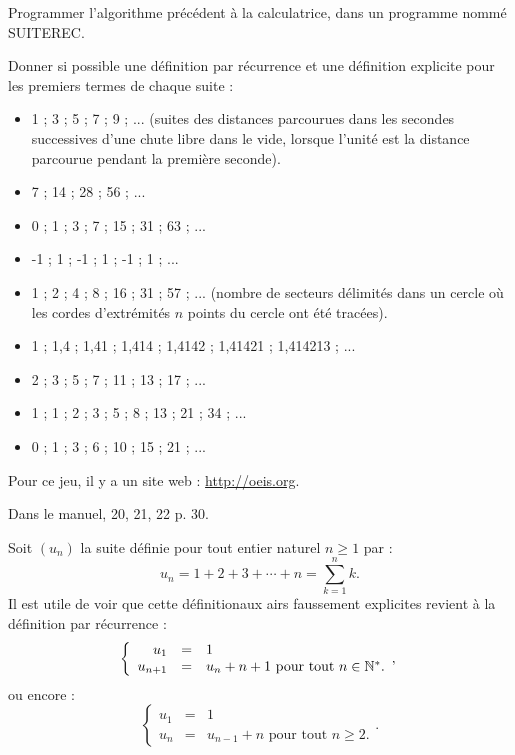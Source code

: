 \documentclass[a4paper,11pt,DIV20,BCOR0mm]{scrartcl}
\begin{document}
\begin{exercice}
 Programmer l'algorithme précédent à la calculatrice, dans un programme nommé SUITEREC.
\end{exercice}


\begin{exercice}
Donner si possible une définition par récurrence et une définition explicite
pour les premiers termes de chaque suite :
\begin{itemize}
 \item 1 ; 3 ; 5 ; 7 ; 9 ; ... (suites des distances parcourues dans les secondes successives d'une chute libre dans le vide, lorsque
l'unité est la distance parcourue pendant la première seconde).
 \item 7 ; 14 ; 28 ; 56 ; ...
 \item 0 ; 1 ; 3 ; 7 ; 15 ; 31 ; 63 ; ... 
 \item -1 ; 1 ; -1 ; 1 ; -1 ; 1 ; ...
 \item 1 ; 2 ; 4 ; 8 ; 16 ; 31 ; 57 ; ... (nombre de secteurs délimités dans un cercle o\`u les cordes d'extrémités $n$ points du cercle ont été tracées).
 \item 1 ; 1,4 ; 1,41 ; 1,414 ; 1,4142 ; 1,41421 ; 1,414213 ; ...
 \item 2 ; 3 ; 5 ; 7 ; 11 ; 13 ; 17 ; ...
 \item 1 ; 1 ; 2 ; 3 ; 5 ; 8 ; 13 ; 21 ; 34 ; ...
 \item 0 ; 1 ; 3 ; 6 ; 10 ; 15 ; 21 ; ... 
\end{itemize}
Pour ce \og jeu\fg, il y a un site web : \url{http://oeis.org}.
\end{exercice}


\begin{exercice}
 Dans le manuel, 20, 21, 22 p. 30.
\end{exercice}

\begin{exemple}
 Soit $(u_n)$ la suite définie pour tout entier naturel $n\geq1$ par :
\[
 u_n = 1+2+3+\cdots+n = \sum_{k=1}^n k.
\]
Il est utile de voir que cette \og définition\fg aux airs faussement explicites revient à la définition
par récurrence :
\[\left\{
\begin{array}{rcl}
 u_1&=&1\\
 u_{n+1}&=&u_n+n+1\text{ pour tout $n\in\mathbb{N}^*$.}
\end{array},
\right.\]
ou encore :
\[\left\{
\begin{array}{rcl}
 u_1&=&1\\
 u_{n}&=&u_{n-1}+n\text{ pour tout $n\geq 2$.}
\end{array}.
\right.\]
\end{exemple}
\end{document}
